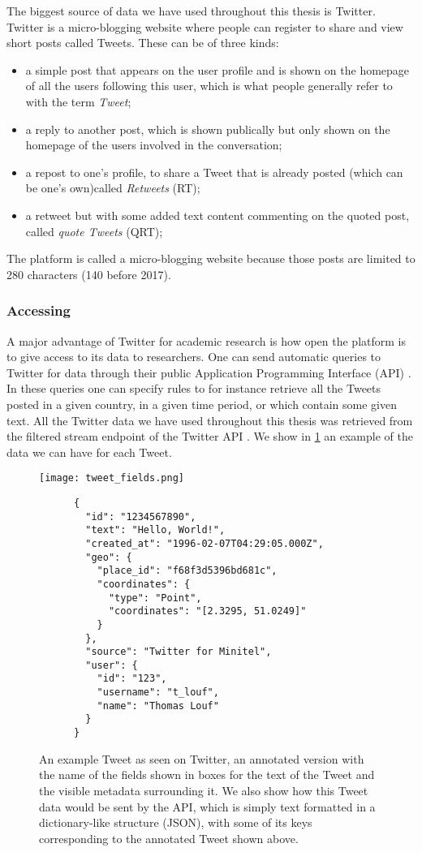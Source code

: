 \documentclass[../thesis.tex]{subfiles}
\begin{document}
The biggest source of data we have used throughout this thesis is Twitter. Twitter is a micro-blogging website where people can register to share and view short posts called Tweets. These can be of three kinds:
\begin{itemize}
  \item a simple post that appears on the user profile and is shown on the homepage of
  all the users following this user, which is what people generally refer to with the
  term \emph{Tweet};
  \item a reply to another post, which is shown publically but only shown on the
  homepage of the users involved in the conversation;
  \item a repost to one's profile, to share a Tweet that is already posted (which can be
  one's own)called \emph{Retweets} (RT);
  \item a retweet but with some added text content commenting on the quoted post, called
  \emph{quote Tweets} (QRT);
\end{itemize}
The platform is called a micro-blogging website because those posts are limited to 280 characters (140 before 2017). %


\subsubsection{Accessing}
A major advantage of Twitter for academic research is how open the platform is to give access to its data to researchers. One can send automatic queries to Twitter for data through their public Application Programming Interface (API) \cite{TwitterAPI}. In these queries one can specify rules to for instance retrieve all the Tweets posted in a given country, in a given time period, or which contain some given text. All the Twitter data we have used throughout this thesis was  retrieved from the filtered stream endpoint of the Twitter API \cite{TwitterAPIa}. We show in \cref{fig:tweet_data} an example of the data we can have for each Tweet. 

\begin{figure}
  \centering
  \texttt{[image: tweet\_fields.png]}
    \begin{verbatim}
      {
        "id": "1234567890",
        "text": "Hello, World!",
        "created_at": "1996-02-07T04:29:05.000Z",
        "geo": {
          "place_id": "f68f3d5396bd681c",
          "coordinates": {
            "type": "Point",
            "coordinates": "[2.3295, 51.0249]"
          }
        },
        "source": "Twitter for Minitel",
        "user": {
          "id": "123",
          "username": "t_louf",
          "name": "Thomas Louf"
        }
      }
    \end{verbatim}
       \caption{An example Tweet as seen on Twitter, an annotated version with the name
        of the fields shown in boxes for the text of the Tweet and the visible metadata
        surrounding it. We also show how this Tweet data would be sent by the API, which
        is simply text formatted in a dictionary-like structure (JSON), with some of its
        keys corresponding to the annotated Tweet shown above.}
       \label{fig:tweet_data}
\end{figure}
\end{document}
